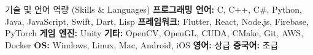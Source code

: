 \begin{rubric}{기술 및 언어 역량 (Skills \& Languages)}
     \textbf{프로그래밍 언어: } C, C++, C\#, Python, Java, JavaScript, Swift, Dart, Lisp
     \textbf{프레임워크:} Flutter, React, Node.js, Firebase, PyTorch
     \textbf{게임 엔진:} Unity
     \textbf{기타:} OpenCV, OpenGL, CUDA, CMake, Git, AWS, Docker
     \textbf{OS:} Windows, Linux, Mac, Android, iOS
    \entry*[Languages] \textbf{영어: } 상급
    \entry*[Languages] \textbf{중국어: } 초급
\end{rubric}